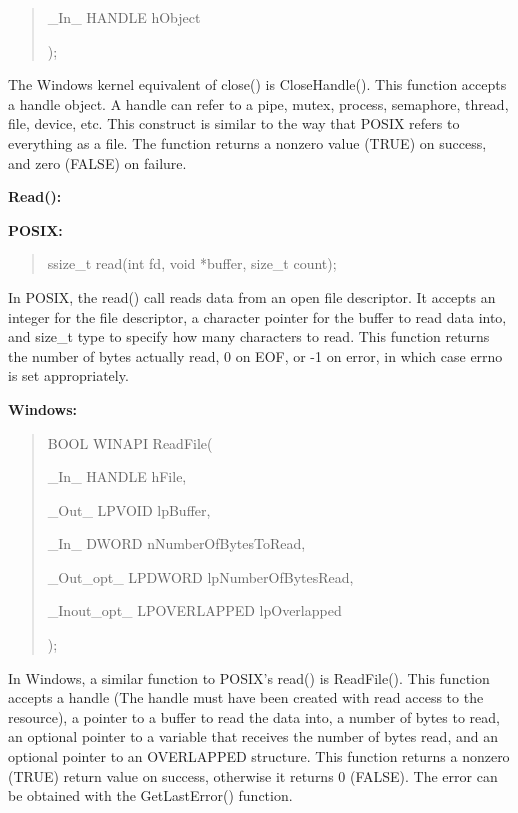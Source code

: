 \documentclass[letterpaper,10pt,titlepage]{article}
\newcommand{\ignore}[2]{\hspace{0in}#2} %
\newcommand{\tab}{\hspace*{2em}} %
\begin{document}
\begin{enumerate}
\begin{quote}
\tab\_In\_  HANDLE hObject

);
\end{quote}

\tab The Windows kernel equivalent of close() is CloseHandle(). This function accepts a handle object. A handle can refer to a pipe, mutex, process, semaphore, thread, file, device, etc. This construct is similar to the way that POSIX refers to everything as a file. The function returns a nonzero value (TRUE) on success, and zero (FALSE) on failure. \newline 

\textbf{Read():}

\textbf{POSIX:} 

\begin{quote}
ssize\_t read(int fd, void *buffer, size\_t count);
\end{quote}

\tab In POSIX, the read() call reads data from an open file descriptor. It accepts an integer for the file descriptor, a character pointer for the buffer to read data into, and size\_t type to specify how many characters to read. This function returns the number of bytes actually read, 0 on EOF, or -1 on error, in which case errno is set appropriately.\newline

\textbf{Windows:} 

\begin{quote}
BOOL WINAPI ReadFile(

\tab\_In\_         HANDLE hFile,

\tab\_Out\_        LPVOID lpBuffer,

\tab\_In\_         DWORD nNumberOfBytesToRead,

\tab\_Out\_opt\_    LPDWORD lpNumberOfBytesRead,

\tab\_Inout\_opt\_  LPOVERLAPPED lpOverlapped

);
\end{quote}


\tab In Windows, a similar function to POSIX's read() is ReadFile(). This function accepts a handle (The handle must have been created with read access to the resource), a pointer to a buffer to read the data into, a number of bytes to read, an optional pointer to a variable that receives the number of bytes read, and an optional pointer to an OVERLAPPED structure. \ignore{[http://msdn.microsoft.com/en-us/library/windows/desktop/aa365467(v=vs.85).aspx]}This function returns a nonzero (TRUE) return value on success, otherwise it returns 0 (FALSE). The error can be obtained with the GetLastError() function.\newline



\end{enumerate}
\end{document}
